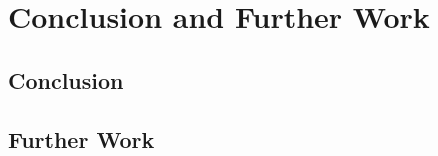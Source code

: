 \chapter{Conclusion and Further Work}
\label{chap:conclusion}
\section{Conclusion}


\section{Further Work}

